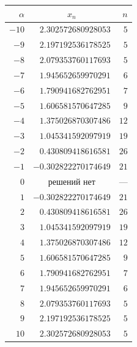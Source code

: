 \documentclass[12pt,a4paper]{article}
\begin{document}
\begin{center}
\renewcommand{\arraystretch}{1.12}
\begin{tabular}{r r r}
\hline
$\alpha$ & \multicolumn{1}{c}{$x_n$} & $n$\\
\hline
$-10$ & $2.302572680928053$ & $5$ \\
$-9$ & $2.197192536178525$ & $5$ \\
$-8$ & $2.079353760117693$ & $5$ \\
$-7$ & $1.945652659970291$ & $6$ \\
$-6$ & $1.790941682762951$ & $7$ \\
$-5$ & $1.606581570647285$ & $9$ \\
$-4$ & $1.375026870307486$ & $12$ \\
$-3$ & $1.045341592097919$ & $19$ \\
$-2$ & $0.430809418616581$ & $26$ \\
$-1$ & $-0.302822270174649$ & $21$ \\
$0$ & \multicolumn{1}{c}{решений нет} & --- \\
$1$ & $-0.302822270174649$ & $21$ \\
$2$ & $0.430809418616581$ & $26$ \\
$3$ & $1.045341592097919$ & $19$ \\
$4$ & $1.375026870307486$ & $12$ \\
$5$ & $1.606581570647285$ & $9$ \\
$6$ & $1.790941682762951$ & $7$ \\
$7$ & $1.945652659970291$ & $6$ \\
$8$ & $2.079353760117693$ & $5$ \\
$9$ & $2.197192536178525$ & $5$ \\
$10$ & $2.302572680928053$ & $5$ \\
\hline
\end{tabular}
\end{center}
\end{document}
